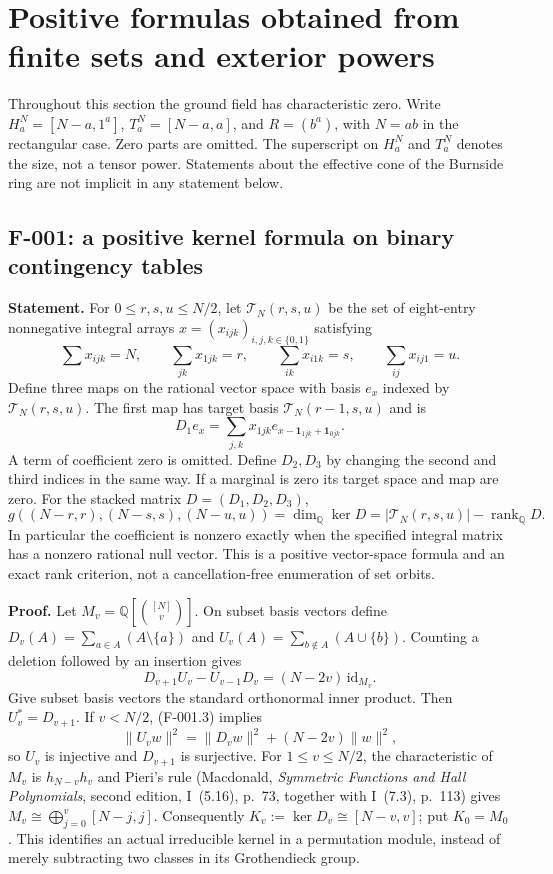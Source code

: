 
\section{Positive formulas obtained from finite sets and exterior powers}
Throughout this section the ground field has characteristic zero. Write
$H_a^N=[N-a,1^a]$, $T_a^N=[N-a,a]$, and $R=(b^a)$, with $N=ab$ in the
rectangular case. Zero parts are omitted. The superscript on $H_a^N$ and
$T_a^N$ denotes the size, not a tensor power. Statements about the effective
cone of the Burnside ring are not implicit in any statement below.

\subsection{F-001: a positive kernel formula on binary contingency tables}
\textbf{Statement.}
For $0\leq r,s,u\leq N/2$, let $\mathcal T_N(r,s,u)$ be the set of eight-entry
nonnegative integral arrays $x=(x_{ijk})_{i,j,k\in\{0,1\}}$ satisfying
\[
 \sum x_{ijk}=N,\qquad \sum_{jk}x_{1jk}=r,\qquad
 \sum_{ik}x_{i1k}=s,\qquad \sum_{ij}x_{ij1}=u.
\]
Define three maps on the rational vector space with basis $e_x$ indexed by
$\mathcal T_N(r,s,u)$. The first map has target basis
$\mathcal T_N(r-1,s,u)$ and is
\[
 D_1e_x=\sum_{j,k}x_{1jk}
 e_{x-\mathbf1_{1jk}+\mathbf1_{0jk}}.                 \tag{F-001.1}
\]
A term of coefficient zero is omitted. Define $D_2,D_3$ by changing the
second and third indices in the same way. If a marginal is zero its target
space and map are zero. For the stacked matrix $D=(D_1,D_2,D_3)$,
\[
 g((N-r,r),(N-s,s),(N-u,u))
 =\dim_{\mathbb Q}\ker D
 =|\mathcal T_N(r,s,u)|-\operatorname{rank}_{\mathbb Q}D. \tag{F-001.2}
\]
In particular the coefficient is nonzero exactly when the specified integral
matrix has a nonzero rational null vector. This is a positive vector-space
formula and an exact rank criterion, not a cancellation-free enumeration of
set orbits.

\textbf{Proof.}
Let $M_v=\mathbb Q[\binom{[N]}v]$. On subset basis vectors define
$D_v(A)=\sum_{a\in A}(A\setminus\{a\})$ and
$U_v(A)=\sum_{b\notin A}(A\cup\{b\})$.
Counting a deletion followed by an insertion gives
\[
 D_{v+1}U_v-U_{v-1}D_v=(N-2v)\,\mathrm{id}_{M_v}.        \tag{F-001.3}
\]
Give subset basis vectors the standard orthonormal inner product. Then
$U_v^*=D_{v+1}$. If $v<N/2$, (F-001.3) implies
\[
 \|U_vw\|^2=\|D_vw\|^2+(N-2v)\|w\|^2,
\]
so $U_v$ is injective and $D_{v+1}$ is surjective. For
$1\leq v\leq N/2$, the characteristic of $M_v$ is $h_{N-v}h_v$ and Pieri's
rule (Macdonald, \emph{Symmetric Functions and Hall Polynomials}, second
edition, I~(5.16), p.~73, together with I~(7.3), p.~113) gives
$M_v\cong\bigoplus_{j=0}^v[N-j,j]$.
Consequently $K_v:=\ker D_v\cong[N-v,v]$; put $K_0=M_0$.
This identifies an actual irreducible kernel in a permutation module, instead
of merely subtracting two classes in its Grothendieck group.

